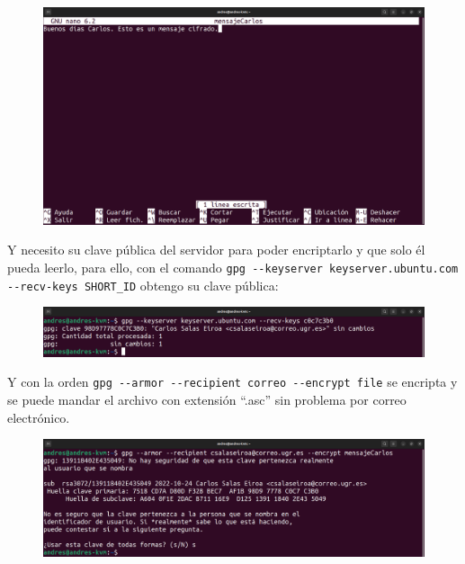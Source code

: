 \documentclass{article}
\begin{document}
\begin{figure}[H]
    \includegraphics[width=\textwidth]{imagenes/Portatil/Captura desde 2022-10-24 12-02-33.png}
\end{figure}

Y necesito su clave pública del servidor para poder encriptarlo y que solo él pueda leerlo, para ello, con el comando \verb|gpg --keyserver keyserver.ubuntu.com --recv-keys SHORT_ID| obtengo su clave pública:

\begin{figure}[H]
    \includegraphics[width=\textwidth]{imagenes/Portatil/Captura desde 2022-10-24 12-11-03.png}
\end{figure}

Y con la orden \verb|gpg --armor --recipient correo --encrypt file| se encripta y se puede mandar el archivo con extensión ``.asc'' sin problema por correo electrónico.

\begin{figure}[H]
    \includegraphics[width=\textwidth]{imagenes/Portatil/Captura desde 2022-10-24 12-11-31.png}
\end{figure}

\newpage
\end{document}
